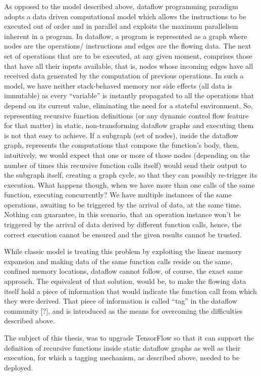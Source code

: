 \documentclass[ack,preface]{dithesis}
\begin{document}
	As opposed to the model described above, dataflow programming paradigm adopts a data driven computational model which allows the instructions to be executed out of order and in parallel and exploits the maximum parallelism inherent in a program. In dataflow, a program is represented as a graph where nodes are the operations/ instructions and edges are the flowing data. The next set of operations that are to be executed, at any given moment, comprises those that have all their inputs available, that is, nodes whose incoming edges have all received data generated by the computation of previous operations. In such a model, we have neither stack-behaved memory nor side effects (all data is immutable) as every “variable” is instantly propagated to all the operations that depend on its current value, eliminating the need for a stateful environment. So, representing recursive function definitions (or any dynamic control flow feature for that matter) in static, non-transforming dataflow graphs and executing them is not that easy to achieve. If a subgraph (set of nodes), inside the dataflow graph, represents the computations that compose the function’s body, then, intuitively, we would expect that one or more of those nodes (depending on the number of times this recursive function calls itself) would send their output to the subgraph itself, creating a graph cycle, so that they can possibly re-trigger its execution. What happens though, when we have more than one calls of the same function, executing concurrently?  We have multiple instances of the same operations, awaiting to be triggered by the arrival of data, at the same time. Nothing can guarantee, in this scenario, that an operation instance won’t be triggered by the arrival of data derived by different function calls, hence, the correct execution cannot be ensured and the given results cannot be trusted.

	While classic model is treating this problem by exploiting the linear memory expansion and making data of the same function calls reside on the same, confined memory locations, dataflow cannot follow, of course, the exact same approach. The equivalent of that solution, would be, to make the flowing data itself hold a piece of information that would indicate the function call from which they were derived. That piece of information is called “tag” in the dataflow community [?], and is introduced as the means for overcoming the difficulties described above.

	The subject of this thesis, was to upgrade TensorFlow so that it can support the definition of recursive functions inside static dataflow graphs as well as their execution, for which a tagging mechanism, as described above, needed to be deployed.
\end{document}
